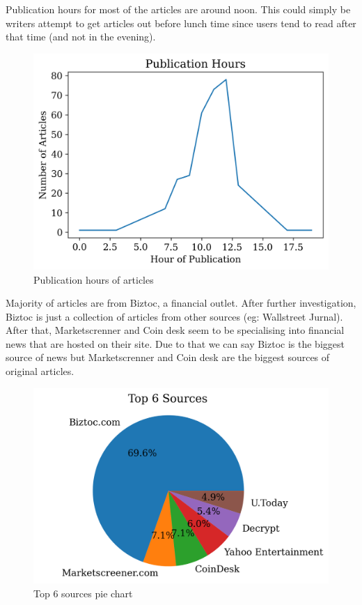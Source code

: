 Publication hours for most of the articles are around noon. This could simply be writers attempt to get articles out before lunch time since users tend to read after that time (and not in the evening).
\begin{figure}[H]
\includegraphics[scale=1]{img/B2/publication_hours.png}
\centering
\caption{Publication hours of articles}
\label{fig:publication_hours}
\end{figure}

Majority of articles are from Biztoc, a financial outlet. After further investigation, Biztoc is just a collection of articles from other sources (eg: Wallstreet Jurnal). After that, Marketscrenner and Coin desk seem to be specialising into financial news that are hosted on their site. Due to that we can say Biztoc is the biggest source of news but Marketscrenner and Coin desk are the biggest sources of original articles.
\begin{figure}[H]
\includegraphics[scale=1]{img/B2/top_6_sources_pie_chart.png}
\centering
\caption{Top 6 sources pie chart}
\label{fig:top_6_sources_pie_chart}
\end{figure}

